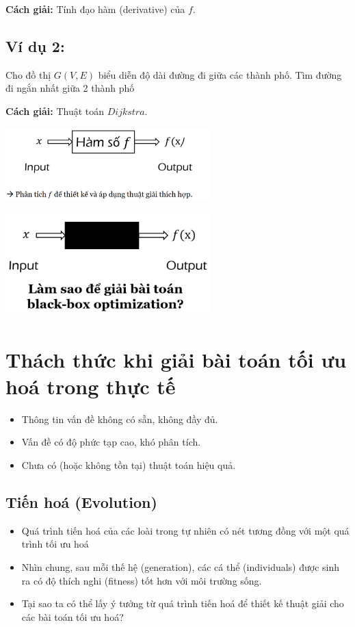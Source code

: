 \documentclass{book}
\begin{document}
\textbf{Cách giải:} Tính đạo hàm (derivative) của $f$.

\subsection*{Ví dụ 2:} %
Cho đồ thị $G(V,E)$ biểu diễn độ dài đường đi giữa các thành
phố. Tìm đường đi ngắn nhất giữa 2 thành phố

\textbf{Cách giải:} Thuật toán $Dijkstra$.

\centering
\includegraphics[width=0.6\textwidth]{images/image.png}

\centering
\includegraphics[width=0.6\textwidth]{images/blackbox.png}

\section*{Thách thức khi giải bài toán tối ưu hoá trong thực tế} %
\begin{itemize}
    \item Thông tin vấn đề không có sẵn, không đầy đủ.
    \item Vấn đề có độ phức tạp cao, khó phân tích.
    \item Chưa có (hoặc không tồn tại) thuật toán hiệu quả.
\end{itemize}

\flushleft
\subsection{Tiến hoá (Evolution)}
\begin{itemize}
    \item Quá trình tiến hoá của các loài trong tự nhiên có nét tương đồng với một quá trình tối ưu hoá
    \item Nhìn chung, sau mỗi thế hệ (generation), các cá thể (individuals) được sinh ra có độ thích nghi (fitness) tốt hơn với môi trường sống.
    \item Tại sao ta có thể lấy ý tưởng từ quá trình tiến hoá để thiết kế thuật giải cho các bài toán tối ưu hoá?
\end{itemize}
\end{document}
